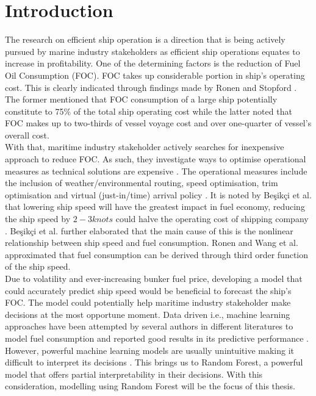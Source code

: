 \section{Introduction} \label{introduction}

The research on efficient ship operation is a direction that is being actively pursued by marine industry stakeholders as efficient ship operations equates to increase in profitability. One of the determining factors is the reduction of Fuel Oil Consumption (FOC). FOC takes up considerable portion in ship's operating cost. This is clearly indicated through findings made by Ronen \cite{Ronen.2011} and Stopford \cite{Stopford.2009}. The former mentioned that FOC consumption of a large ship potentially constitute to 75\% of the total ship operating cost while the latter noted that FOC makes up to two-thirds of vessel voyage cost and over one-quarter of vessel's overall cost. \\

With that, maritime industry stakeholder actively searches for inexpensive approach to reduce FOC. As such, they investigate ways to optimise operational measures as technical solutions are expensive \cite{Li.2022}. The operational measures include the inclusion of weather/environmental routing, speed optimisation, trim optimisation and virtual (just-in/time) arrival policy \cite{Li.2022}. It is noted by {Be{\c{s}}ik{\c{c}}i} et al. \cite{BalBesikci.2016} that lowering ship speed will have the greatest impact in fuel economy, reducing the ship speed by $2-3 knots$  could halve the operating cost of shipping company \cite{Stopford.2009,Wijnolst.2009}. {Be{\c{s}}ik{\c{c}}i} et al. further elaborated that the main cause of this is the nonlinear relationship between ship speed and fuel consumption. Ronen \cite{Ronen.1982,Ronen.2011} and Wang et al. \cite{Wang.2012} approximated that fuel consumption can be derived through third order function of the ship speed. \\

Due to volatility and ever-increasing bunker fuel price, developing a model that could accurately predict ship speed would be beneficial to forecast the ship's FOC. The model could potentially help maritime industry stakeholder make decisions at the most opportune moment. Data driven i.e., machine learning approaches have been attempted by several authors in different literatures to model fuel consumption and reported good results in its predictive performance \cite{BalBesikci.2016,Jeon.2018,Gkerekos.2019,Abebe.2020,Kim.2021}. However, powerful machine learning models are usually unintuitive making it difficult to interpret its decisions \cite{Geron.2019}. This brings us to Random Forest, a powerful model that offers partial interpretability in their decisions. With this consideration, modelling using Random Forest will be the focus of this thesis.

